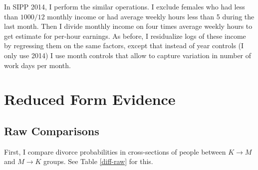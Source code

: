 \documentclass[12pt,letter]{article}
\begin{document}
In SIPP 2014, I perform the similar operations. I exclude females who had less than $1000/12$ monthly income or had average weekly hours less than 5 during the last month. Then I divide monthly income on four times average weekly hours to get estimate for per-hour earnings. As before, I residualize logs of these income by regressing them on the same factors, except that instead of year controls (I only use 2014) I use month controls that allow to capture variation in number of work days per month. 

\section{Reduced Form Evidence}
\subsection{Raw Comparisons}
First, I compare divorce probabilities in cross-sections of people between $K\to M$ and $M\to K$ groups. See Table \ref{diff-raw} for this.
\end{document}
